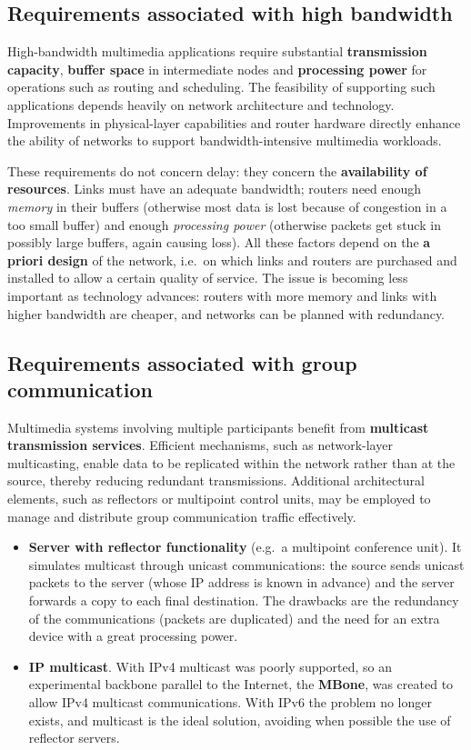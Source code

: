\documentclass[11pt,a4paper,openany]{report}
\begin{document}
\subsection{Requirements associated with high bandwidth}

High-bandwidth multimedia applications require substantial \textbf{transmission capacity}, \textbf{buffer space} in intermediate nodes and \textbf{processing power} for operations such as routing and scheduling. The feasibility of supporting such applications depends heavily on network architecture and technology. Improvements in physical-layer capabilities and router hardware directly enhance the ability of networks to support bandwidth-intensive multimedia workloads.

These requirements do not concern delay: they concern the \textbf{availability of resources}. Links must have an adequate bandwidth; routers need enough \emph{memory} in their buffers (otherwise most data is lost because of congestion in a too small buffer) and enough \emph{processing power} (otherwise packets get stuck in possibly large buffers, again causing loss). All these factors depend on the \textbf{a priori design} of the network, i.e.\ on which links and routers are purchased and installed to allow a certain quality of service. The issue is becoming less important as technology advances: routers with more memory and links with higher bandwidth are cheaper, and networks can be planned with redundancy.

\subsection{Requirements associated with group communication}

Multimedia systems involving multiple participants benefit from \textbf{multicast transmission services}. Efficient mechanisms, such as network-layer multicasting, enable data to be replicated within the network rather than at the source, thereby reducing redundant transmissions. Additional architectural elements, such as reflectors or multipoint control units, may be employed to manage and distribute group communication traffic effectively.

\begin{itemize}
	\item \textbf{Server with reflector functionality} (e.g.\ a multipoint conference unit). It simulates multicast through unicast communications: the source sends unicast packets to the server (whose IP address is known in advance) and the server forwards a copy to each final destination. The drawbacks are the redundancy of the communications (packets are duplicated) and the need for an extra device with a great processing power.
	\item \textbf{IP multicast}. With IPv4 multicast was poorly supported, so an experimental backbone parallel to the Internet, the \textbf{MBone}, was created to allow IPv4 multicast communications. With IPv6 the problem no longer exists, and multicast is the ideal solution, avoiding when possible the use of reflector servers.
\end{itemize}
\end{document}
